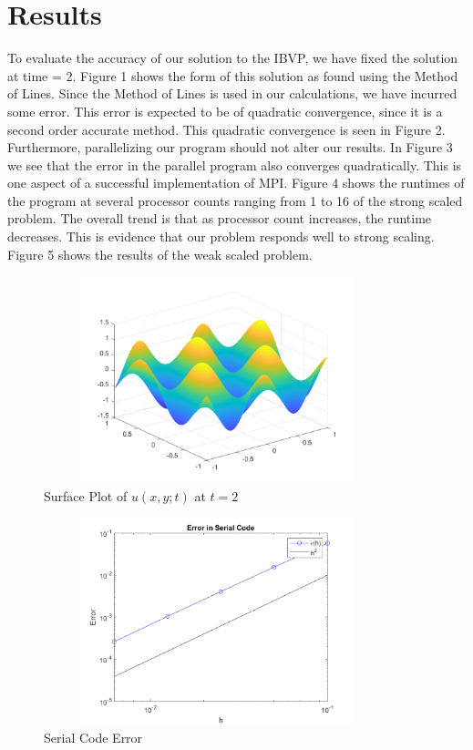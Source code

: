 \documentclass[12pt]{article}
\begin{document}
	\section{Results}
To evaluate the accuracy of our solution to the IBVP, we have fixed the solution at time = 2. Figure 1 shows the form of this solution as found using the Method of Lines. Since the Method of Lines is used in our calculations, we have incurred some error. This error is expected to be of quadratic convergence, since it is a second order accurate method. This quadratic convergence is seen in Figure 2. Furthermore, parallelizing our program should not alter our results. In Figure 3 we see that the error in the parallel program also converges quadratically. This is one aspect of a successful implementation of MPI.
\newline \newline
Figure 4 shows the runtimes of the program at several processor counts ranging from 1 to 16 of the strong scaled problem. The overall trend is that as processor count increases, the runtime decreases. This is evidence that our problem responds well to strong scaling. Figure 5 shows the results of the weak scaled problem.
		\begin{figure}[H]
			\centering
			\includegraphics[width=100mm,height=60mm]{u_surface.png}
			\caption{Surface Plot of $u(x,y;t)$ at $t=2$}
		\end{figure}
		\vspace{1in}
		\begin{figure}[H]
			\centering
			\includegraphics[width=100mm,height=60mm]{error_serial.png}
			\caption{Serial Code Error}
		\end{figure}
\end{document}
